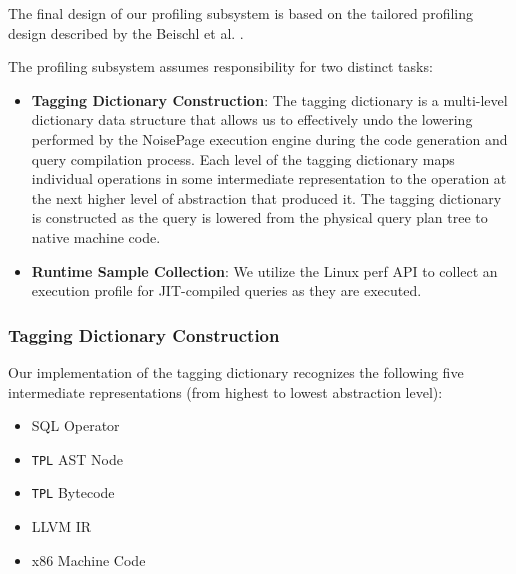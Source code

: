 \documentclass{vldb}
\newcommand{\tpl}{\texttt{TPL}\xspace}
\begin{document}
The final design of our profiling subsystem is based on the tailored profiling design described by the Beischl et al. \cite{beischl21}.

The profiling subsystem assumes responsibility for two distinct tasks:

\begin{itemize}
    \item \textbf{Tagging Dictionary Construction}: The tagging dictionary is a multi-level dictionary data structure that allows us to effectively undo the lowering performed by the NoisePage execution engine during the code generation and query compilation process. Each level of the tagging dictionary maps individual operations in some intermediate representation to the operation at the next higher level of abstraction that produced it. The tagging dictionary is constructed as the query is lowered from the physical query plan tree to native machine code.
    \item \textbf{Runtime Sample Collection}: We utilize the Linux perf API \cite{perf} to collect an execution profile for JIT-compiled queries as they are executed. 
\end{itemize}

\subsubsection{Tagging Dictionary Construction}

Our implementation of the tagging dictionary recognizes the following five intermediate representations (from highest to lowest abstraction level):
\begin{itemize}
    \item SQL Operator
    \item \tpl AST Node
    \item \tpl Bytecode
    \item LLVM IR
    \item x86 Machine Code
\end{itemize}
\end{document}
